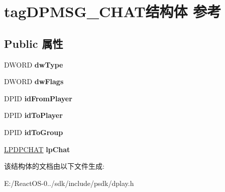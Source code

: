 \hypertarget{structtag_d_p_m_s_g___c_h_a_t}{}\section{tag\+D\+P\+M\+S\+G\+\_\+\+C\+H\+A\+T结构体 参考}
\label{structtag_d_p_m_s_g___c_h_a_t}
\subsection*{Public 属性}
\begin{DoxyCompactItemize}
\item 
\mbox{\label{structtag_d_p_m_s_g___c_h_a_t_a0f051bd2d0c31026ff5881fc77db474e}} 
D\+W\+O\+RD {\bfseries dw\+Type}
\item 
\mbox{\label{structtag_d_p_m_s_g___c_h_a_t_a83581f570d9c0393de34ab9dfa00ecb5}} 
D\+W\+O\+RD {\bfseries dw\+Flags}
\item 
\mbox{\label{structtag_d_p_m_s_g___c_h_a_t_a16c2c414cce15513648cd28bbd83f806}} 
D\+P\+ID {\bfseries id\+From\+Player}
\item 
\mbox{\label{structtag_d_p_m_s_g___c_h_a_t_afc77316167a8fb4e499c3a3f99a2786d}} 
D\+P\+ID {\bfseries id\+To\+Player}
\item 
\mbox{\label{structtag_d_p_m_s_g___c_h_a_t_a3baf48eff5160254a87ea1686bf7fec3}} 
D\+P\+ID {\bfseries id\+To\+Group}
\item 
\mbox{\label{structtag_d_p_m_s_g___c_h_a_t_a54c512b8c9e0a74f7d19b9649fb096fc}} 
\hyperlink{structtag_d_p_c_h_a_t}{L\+P\+D\+P\+C\+H\+AT} {\bfseries lp\+Chat}
\end{DoxyCompactItemize}


该结构体的文档由以下文件生成\+:\begin{DoxyCompactItemize}
\item 
E\+:/\+React\+O\+S-\/0../sdk/include/psdk/dplay.\+h\end{DoxyCompactItemize}
